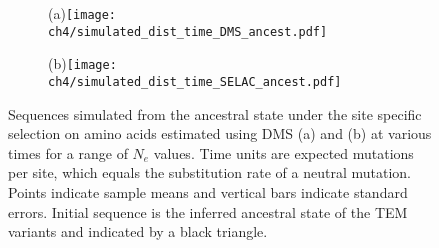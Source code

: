 \begin{figure}
    \centering
    \begin{subfigure}
        \centering
       (a)\texttt{[image: ch4/simulated\_dist\_time\_DMS\_ancest.pdf]}
    \end{subfigure}
    \begin{subfigure}
        \centering
        (b)\texttt{[image: ch4/simulated\_dist\_time\_SELAC\_ancest.pdf]}
    \end{subfigure}
    \caption{Sequences simulated from the ancestral state under the site specific selection on amino acids estimated using DMS (a) and \selac (b) at various times for a range of $N_e$ values.
    Time units are expected mutations per site, which equals the substitution rate of a neutral mutation.
    Points indicate sample means and vertical bars indicate standard errors. Initial sequence is the inferred ancestral state of the TEM variants and indicated by a black triangle.}
    \label{fig:dis_sim}
\end{figure}

\clearpage

